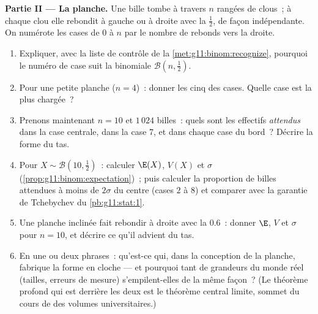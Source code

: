 \begin{problem}
\medskip
\noindent\textbf{Partie II --- La planche.}
Une bille tombe à travers $n$ rangées de clous~; à chaque clou elle
rebondit à gauche ou à droite avec la  $\frac12$, de
façon indépendante. On numérote les cases de $0$ à $n$ par le nombre
de rebonds vers la droite.
\begin{enumerate}[resume]
  \item Expliquer, avec la liste de contrôle de la
        \cref{met:g11:binom:recognize}, pourquoi le numéro de case
        suit la  binomiale
        $\mathcal B\!\left(n, \frac12\right)$.
  \item Pour une petite planche ($n = 4$)~: donner les cinq
         des cases. Quelle case est la plus chargée~?
  \item Prenons maintenant $n = 10$ et $1\,024$ billes~: quels sont
        les effectifs \emph{attendus} dans la case centrale, dans la
        case $7$, et dans chaque case du bord~? Décrire la forme du
        tas.
  \item Pour $X \sim \mathcal B\!\left(10, \frac12\right)$~:
        calculer $\E(X)$, $V(X)$ et $\sigma$
        (\cref{prop:g11:binom:expectation})~; puis calculer la
        proportion de billes attendues à moins de $2\sigma$ du
        centre (cases $2$ à $8$) et comparer avec la garantie de
        Tchebychev du \cref{pb:g11:stat:1}.
  \item Une planche inclinée fait rebondir à droite avec la
         $0.6$~: donner $\E$, $V$ et $\sigma$ pour
        $n = 10$, et décrire ce qu'il advient du tas.
  \item En une ou deux phrases~: qu'est-ce qui, dans la conception
        de la planche, fabrique la forme en cloche --- et pourquoi
        tant de grandeurs du monde réel (tailles, erreurs de mesure)
        s'empilent-elles de la même façon~? (Le théorème profond qui
        est derrière les deux est le théorème central limite, sommet
        du cours de  des volumes universitaires.)
\end{enumerate}


\end{problem}
